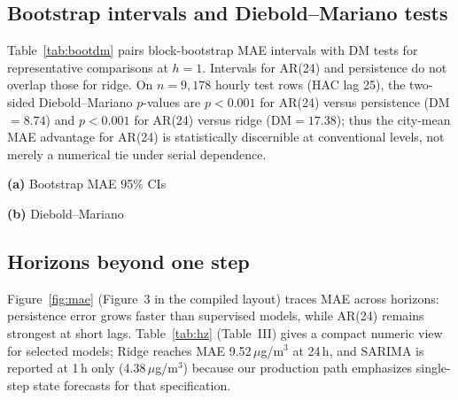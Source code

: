 \documentclass[conference]{IEEEtran}
\newcommand{\tablestretch}{\renewcommand{\arraystretch}{1.08}}
\begin{document}
\begin{table}[!t]
\centering
\tablestretch
\footnotesize
\caption{Test performance at horizon $h=1$\,h, city-average $PM_{2.5}$ ($\mu$g/m$^3$).}
\label{tab:main}

\end{table}

\subsection{Bootstrap intervals and Diebold--Mariano tests}
Table~\ref{tab:bootdm} pairs block-bootstrap MAE intervals with DM tests for representative comparisons at $h{=}1$. Intervals for AR(24) and persistence do not overlap those for ridge. On $n{=}9{,}178$ hourly test rows (HAC lag 25), the two-sided Diebold--Mariano $p$-values are $p{<}0.001$ for AR(24) versus persistence (DM${=}8.74$) and $p{<}0.001$ for AR(24) versus ridge (DM${=}17.38$); thus the city-mean MAE advantage for AR(24) is statistically discernible at conventional levels, not merely a numerical tie under serial dependence.

\begin{table}[!t]
\centering
\footnotesize
\caption{Left: block-bootstrap 95\% MAE intervals. Right: Diebold--Mariano tests on absolute loss (illustrative pairs, $h{=}1$).}
\label{tab:bootdm}
\begin{minipage}[t]{0.49\textwidth}\centering
\tablestretch
\textbf{(a)} Bootstrap MAE 95\% CIs\par\vspace{0.4em}

\end{minipage}\hfill
\begin{minipage}[t]{0.49\textwidth}\centering
\tablestretch
\textbf{(b)} Diebold--Mariano\par\vspace{0.4em}

\end{minipage}
\end{table}

\subsection{Horizons beyond one step}
Figure~\ref{fig:mae} (Figure~3 in the compiled layout) traces MAE across horizons: persistence error grows faster than supervised models, while AR(24) remains strongest at short lags. Table~\ref{tab:hz} (Table~III) gives a compact numeric view for selected models; Ridge reaches MAE 9.52\,$\mu$g/m$^3$ at 24\,h, and SARIMA is reported at 1\,h only (4.38\,$\mu$g/m$^3$) because our production path emphasizes single-step state forecasts for that specification.
\end{document}

